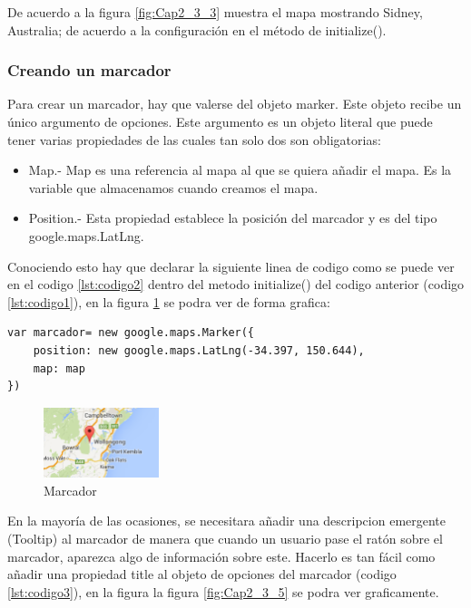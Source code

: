  \hspace*{1cm}De acuerdo a la figura \ref {fig:Cap2_3_3} muestra el mapa mostrando Sidney, Australia; de acuerdo a la configuración en el método de initialize().
 
\subsubsection{Creando un marcador}
Para crear un marcador, hay que valerse del objeto marker. Este objeto recibe un único argumento de opciones. Este argumento es un objeto literal que puede tener varias propiedades de las cuales tan solo dos son obligatorias:\\

\begin{itemize}
    \item Map.- Map es una referencia al mapa al que se quiera añadir el mapa. Es la variable que almacenamos cuando creamos el mapa.
    \item Position.- Esta propiedad establece la posición del marcador y es del tipo google.maps.LatLng.
\end{itemize}


Conociendo esto hay que declarar la siguiente linea de codigo como se puede ver en el codigo \ref{lst:codigo2} dentro del metodo initialize() del codigo anterior (codigo \ref{lst:codigo1}), en la figura \ref {fig:Cap2_3_4} se podra ver de forma grafica:\\

\begin{lstlisting}[language=HTML, caption=Marcador, label=lst:codigo2]
var marcador= new google.maps.Marker({
    position: new google.maps.LatLng(-34.397, 150.644),
    map: map
})
\end{lstlisting}

    \begin{figure}[hbtp]
        \centering
            \includegraphics[width=0.3\textwidth]{Imagenes/Cap2_3_4.png}
            \caption{Marcador}  
            \label{fig:Cap2_3_4}
    \end{figure}
    

\hspace*{1cm}En la mayoría de las ocasiones, se necesitara añadir una descripcion emergente (Tooltip) al marcador de manera que cuando un usuario pase el ratón sobre el marcador, aparezca algo de información sobre este. Hacerlo es tan fácil como añadir una propiedad title al objeto de opciones del marcador (codigo \ref{lst:codigo3}), en la figura la figura \ref {fig:Cap2_3_5} se podra ver graficamente.\\

